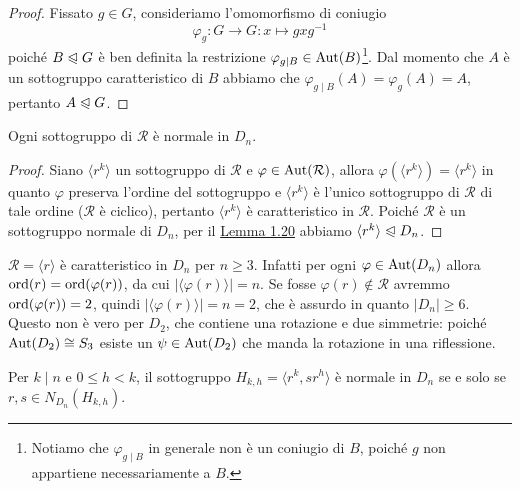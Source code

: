 \documentclass[11pt]{scrartcl}
\begin{document}
\begin{proof}
    Fissato $g \in G$, consideriamo l'omomorfismo di coniugio 
    \[
        \varphi_g : G\longrightarrow G : x\longmapsto gxg^{-1}
    \] poiché 
    $B\trianglelefteqslant G$ è ben definita la restrizione $\varphi_{g\mid B} \in \operatorname{Aut}(B)$\footnote{
        Notiamo che $\varphi_{g\mid B}$ in generale non è un 
        coniugio di $B$, poiché $g$ non appartiene necessariamente a $B$.
    }. 
    Dal momento che $A$ è
    un sottogruppo caratteristico di $B$ abbiamo che $\varphi_{g\mid B}(A) =
    \varphi_g(A) = A$,
    pertanto $A \trianglelefteqslant G$.
\end{proof}


\begin{corollary}
    Ogni sottogruppo di $\mathcal{R}$ è normale in $D_n$.
\end{corollary}

\begin{proof}
    Siano $\langle r^k\rangle$ un sottogruppo di $\mathcal{R}$ e $\varphi
    \in \operatorname{Aut}(\mathcal{R})$, allora $\varphi(\langle r^k\rangle) = \langle r^k\rangle$
    in quanto $\varphi$ preserva l'ordine del sottogruppo e $\langle r^k\rangle$
    è l'unico sottogruppo di $\mathcal{R}$ di tale ordine ($\mathcal{R}$ è ciclico),
    pertanto $\langle r^k\rangle$
    è caratteristico in $\mathcal{R}$. Poiché $\mathcal{R}$ è un sottogruppo
    normale di $D_n$, per il \hyperref[lemma1.0]{Lemma 1.20}
    abbiamo $\langle r^k\rangle\trianglelefteqslant D_n$.
\end{proof}

\begin{remark}
    $\mathcal{R} = \langle r \rangle$ è caratteristico in $D_n$ per $n \geqslant 3$.
    Infatti per ogni $\varphi \in \operatorname{Aut}(D_n)$ allora
    $\operatorname{ord}(r) = \operatorname{ord}(\varphi(r))$, da cui $|\langle\varphi(r)\rangle| = n$.
    Se fosse $\varphi(r) \notin \mathcal{R}$ avremmo $\operatorname{ord}(\varphi(r)) = 2$, 
    quindi $|\langle \varphi(r)\rangle| = n = 2$, che è assurdo in quanto $|D_n| \geqslant 6$.
    Questo non è vero per $D_2$, che contiene una rotazione e due
    simmetrie: poiché $\operatorname{Aut}(D_2) \cong S_3$ esiste un $\psi \in \operatorname{Aut}(D_2)$ che manda 
    la rotazione in una riflessione.
\end{remark}

\begin{corollary}
    Per $k\mid n$ e $0\leq h < k$, il sottogruppo $H_{k, h} = \langle r^k, sr^h\rangle$
    è normale in $D_n$ se e solo se $r, s \in N_{D_n}(H_{k, h})$.
\end{corollary}
\end{document}
